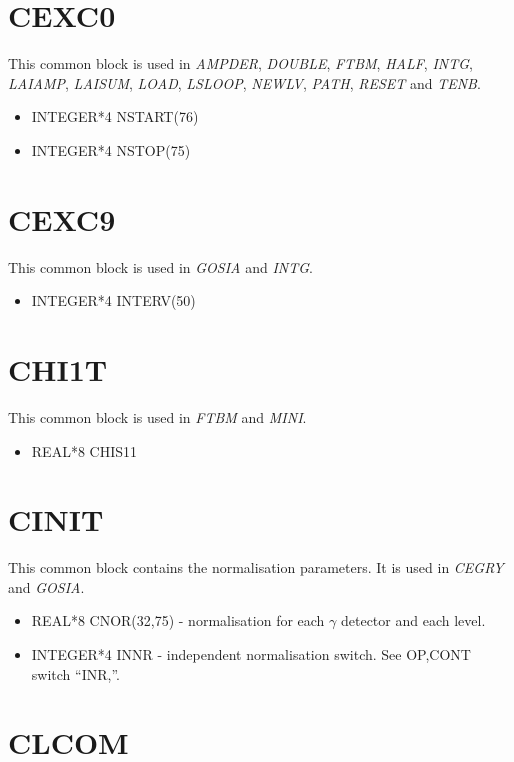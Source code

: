 \section{CEXC0}

This common block is used in {\em AMPDER}, {\em DOUBLE}, {\em FTBM}, {\em
HALF}, {\em INTG}, {\em LAIAMP}, {\em LAISUM}, {\em LOAD}, {\em LSLOOP},
{\em NEWLV}, {\em PATH}, {\em RESET} and {\em TENB}.

\begin{itemize}
\item INTEGER*4 NSTART(76)
\item INTEGER*4 NSTOP(75)
\end{itemize}

\section{CEXC9}

This common block is used in {\em GOSIA} and {\em INTG}.

\begin{itemize}
\item INTEGER*4 INTERV(50)
\end{itemize}

\section{CHI1T}

This common block is used in {\em FTBM} and {\em MINI}.

\begin{itemize}
\item REAL*8 CHIS11
\end{itemize}

\section{CINIT}

This common block contains the normalisation parameters. It is used in {\em
CEGRY} and {\em GOSIA}.

\begin{itemize}
\item REAL*8 CNOR(32,75) - normalisation for each $\gamma$ detector and each
level.
\item INTEGER*4 INNR - independent normalisation switch. See OP,CONT switch
``INR,''.
\end{itemize}

\section{CLCOM}

